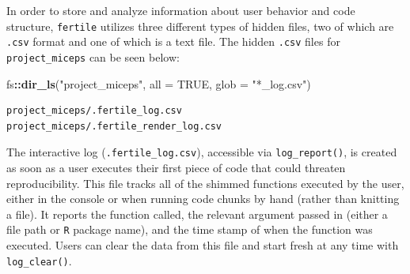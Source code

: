 \documentclass[12pt,twoside]{reedthesis}
\newenvironment{Shaded}{\begin{snugshade}}{\end{snugshade}}
\newcommand{\KeywordTok}[1]{\textcolor[rgb]{0.13,0.29,0.53}{\textbf{#1}}}
\newcommand{\DataTypeTok}[1]{\textcolor[rgb]{0.13,0.29,0.53}{#1}}
\newcommand{\StringTok}[1]{\textcolor[rgb]{0.31,0.60,0.02}{#1}}
\newcommand{\OtherTok}[1]{\textcolor[rgb]{0.56,0.35,0.01}{#1}}
\newcommand{\OperatorTok}[1]{\textcolor[rgb]{0.81,0.36,0.00}{\textbf{#1}}}
\newcommand{\NormalTok}[1]{#1}
\begin{document}
In order to store and analyze information about user behavior and code
structure, \texttt{fertile} utilizes three different types of hidden
files, two of which are \texttt{.csv} format and one of which is a text
file. The hidden \texttt{.csv} files for \texttt{project\_miceps} can be
seen below:
\begin{Shaded}
\begin{Highlighting}[]
\NormalTok{fs}\OperatorTok{::}\KeywordTok{dir_ls}\NormalTok{(}\StringTok{"project_miceps"}\NormalTok{, }\DataTypeTok{all =} \OtherTok{TRUE}\NormalTok{, }\DataTypeTok{glob =} \StringTok{"*_log.csv"}\NormalTok{)}
\end{Highlighting}
\end{Shaded}
\begin{verbatim}
project_miceps/.fertile_log.csv        project_miceps/.fertile_render_log.csv 
\end{verbatim}
The interactive log (\texttt{.fertile\_log.csv}), accessible via
\texttt{log\_report()}, is created as soon as a user executes their
first piece of code that could threaten reproducibility. This file
tracks all of the shimmed functions executed by the user, either in the
console or when running code chunks by hand (rather than knitting a
file). It reports the function called, the relevant argument passed in
(either a file path or \texttt{R} package name), and the time stamp of
when the function was executed. Users can clear the data from this file
and start fresh at any time with \texttt{log\_clear()}.
\end{document}

